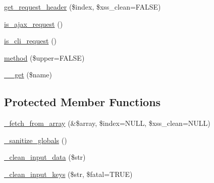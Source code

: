 \begin{DoxyCompactItemize}
\item 
\hyperlink{class_c_i___input_a099af71b54f9edbfb20576a4e8a3df41}{get\+\_\+request\+\_\+header} (\$index, \$xss\+\_\+clean=F\+A\+L\+S\+E)
\item 
\hyperlink{class_c_i___input_a4ae07120b0b2ace90eb2f7ec72b29426}{is\+\_\+ajax\+\_\+request} ()
\item 
\hyperlink{class_c_i___input_a70c1e8a081ef955c1a52164634d4f66e}{is\+\_\+cli\+\_\+request} ()
\item 
\hyperlink{class_c_i___input_aaa22626885bdf9dda2346ee6422203ef}{method} (\$upper=F\+A\+L\+S\+E)
\item 
\hyperlink{class_c_i___input_abc8e9e31bb15c8a44c3210ec551407c8}{\+\_\+\+\_\+get} (\$name)
\end{DoxyCompactItemize}
\subsection*{Protected Member Functions}
\begin{DoxyCompactItemize}
\item 
\hyperlink{class_c_i___input_aac46f9fee9467fac5711f236d248fbc7}{\+\_\+fetch\+\_\+from\+\_\+array} (\&\$array, \$index=N\+U\+L\+L, \$xss\+\_\+clean=N\+U\+L\+L)
\item 
\hyperlink{class_c_i___input_aadbb0e5cbf9b5783c872cb402ea6a2fa}{\+\_\+sanitize\+\_\+globals} ()
\item 
\hyperlink{class_c_i___input_a9c594152e7b189a290f6425df8712b73}{\+\_\+clean\+\_\+input\+\_\+data} (\$str)
\item 
\hyperlink{class_c_i___input_ac1c5fa9a21372d3dacb1fb99f9418384}{\+\_\+clean\+\_\+input\+\_\+keys} (\$str, \$fatal=T\+R\+U\+E)
\end{DoxyCompactItemize}
